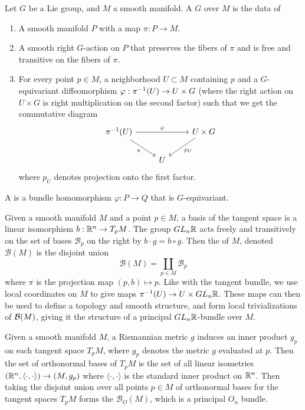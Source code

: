 %
\begin{defn}
Let $G$ be a Lie group, and $M$ a smooth manifold. A  $G$
over $M$ is the data of
%
\begin{enumerate}
  \item A smooth manifold $P$ with a map $\pi : P \to M$.
  \item A smooth right $G$-action on $P$ that preserves the fibers of $\pi$ and
  is free and transitive on the fibers of $\pi$.
  \item For every point $p \in M$, a neighborhood $U \subset M$ containing $p$ and
  a $G$-equivariant diffeomorphism $\varphi: \pi^{-1}(U) \to U \times G$ (where
  the right action on $U \times G$ is right multiplication on the second factor)
  such that we get the commutative diagram
  \[\begin{tikzcd}
  \pi\inv(U) \ar[dr, "\pi"']\ar[rr, "\varphi"]&& U \times G \ar[dl, "p_U"]\\
  & U
  \end{tikzcd}\]
  where $p_U$ denotes projection onto the first factor.
\end{enumerate}
A  is a bundle homomorphism $\varphi : P \to Q$
that is $G$-equivariant.
\end{defn}
%
\begin{exmp}
Given a smooth manifold $M$ and a point $p \in M$, a basis of the
tangent space is a linear isomorphism $b : \mathbb{R}^n \to T_pM$. The group
$GL_n\mathbb{R}$ acts freely and transitively on the set of bases $\mathcal{B}_p$ on the right by
$b \cdot g = b \circ g$. Then the  of $M$, denoted
$\mathcal{B}(M)$ is the disjoint union
\[
\mathcal{B}(M) = \coprod_{p \in M}\mathcal{B}_p
\]
where $\pi$ is the projection map $(p,b) \mapsto p$. Like with the tangent
bundle, we use local coordinates on $M$ to give maps $\pi^{-1}(U) \to U \times GL_n\mathbb{R}$.
These maps can then be used to define a topology and smooth structure, and
form local trivializations of $\mathcal{B}(M)$, giving it the structure of a principal
$GL_n\mathbb{R}$-bundle over $M$.
\end{exmp}
%
\begin{exmp}
Given a smooth manifold $M$, a Riemannian metric $g$ induces an inner product
$g_p$ on each tangent space $T_pM$, where $g_p$ denotes the metric $g$ evaluated
at $p$. Then the set of orthonormal bases of $T_pM$ is the
set of all linear isometries $(\mathbb{R}^n, \langle\cdot,\cdot\rangle) \to (M, g_p)$
where $\langle\cdot,\cdot\rangle$ is the standard inner product on $\mathbb{R}^n$.
Then taking the disjoint union over all points $p\in M$ of orthonormal bases
for the tangent spaces $T_pM$ forms the 
$\mathcal{B}_O(M)$, which is a principal $O_n$ bundle.
\end{exmp}
